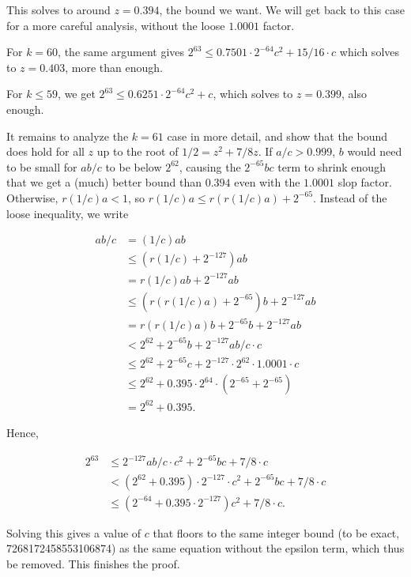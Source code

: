 \documentclass{article}
\begin{document}
This solves to around $z = 0.394$, the bound we want. We will get back to this case for a more careful analysis, without the loose $1.0001$ factor.

For $k = 60$, the same argument gives $2^{63} \le 0.7501 \cdot 2^{-64} c^2 + 15/16 \cdot c$ which solves to $z = 0.403$, more than enough.

For $k \le 59$, we get $2^{63} \le 0.6251 \cdot 2^{-64} c^2 + c$, which solves to $z = 0.399$, also enough.

It remains to analyze the $k = 61$ case in more detail, and show that the bound does hold for all $z$ up to the root of $1/2 = z^2 + 7/8z$. If $a/c > 0.999$, $b$ would need to be small for $ab/c$ to be below $2^{62}$, causing the $2^{-65}bc$ term to shrink enough that we get a (much) better bound than $0.394$ even with the $1.0001$ slop factor. Otherwise, $r(1/c)a < 1$, so $r(1/c)a \le r(r(1/c)a) + 2^{-65}$. Instead of the loose inequality, we write

\begin{align*}
ab/c
  &= (1/c)ab \\
  &\le (r(1/c) + 2^{-127})ab \\
  &= r(1/c)ab + 2^{-127}ab \\
  &\le (r(r(1/c)a) + 2^{-65})b + 2^{-127}ab \\
  &= r(r(1/c)a)b + 2^{-65}b + 2^{-127}ab \\
  &< 2^{62} + 2^{-65}b + 2^{-127}ab/c\cdot c \\
  &\le 2^{62} + 2^{-65}c + 2^{-127} \cdot 2^{62} \cdot 1.0001 \cdot c \\
  &\le 2^{62} + 0.395\cdot 2^{64} \cdot (2^{-65} + 2^{-65}) \\
  &= 2^{62} + 0.395.
\end{align*}

Hence,

\begin{align*}
2^{63}
  &\le 2^{-127}ab/c\cdot c^2 + 2^{-65}bc + 7/8 \cdot c \\
  &< (2^{62} + 0.395) \cdot 2^{-127} \cdot c^2 + 2^{-65}bc + 7/8 \cdot c \\
  &\le (2^{-64} + 0.395 \cdot 2^{-127}) c^2 + 7/8 \cdot c.
\end{align*}

Solving this gives a value of $c$ that floors to the same integer bound (to be exact, 7268172458553106874) as the same equation without the epsilon term, which thus be removed. This finishes the proof.
\end{document}
